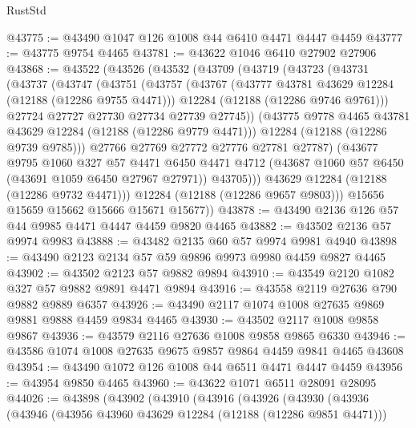 \begin{lexlean}{RustStd}
\begin{coremodule}
@43775 := @43490 @1047 @126 @1008 @44 @6410 @4471 @4447 @4459
@43777 := @43775 @9754 @4465
@43781 := @43622 @1046 @6410 @27902 @27906
@43868 := @43522
    (@43526
      (@43532
        (@43709
          (@43719
            (@43723
              (@43731
                (@43737
                  (@43747
                    (@43751
                      (@43757
                        (@43767
                          (@43777 @43781 @43629 @12284 (@12188 (@12286 @9755 @4471)))
                          @12284
                          (@12188 (@12286 @9746 @9761)))
                        @27724
                        @27727
                        @27730
                        @27734
                        @27739
                        @27745))
                    (@43775 @9778 @4465 @43781 @43629 @12284 (@12188 (@12286 @9779 @4471)))
                    @12284
                    (@12188 (@12286 @9739 @9785)))
                  @27766
                  @27769
                  @27772
                  @27776
                  @27781
                  @27787)
                (@43677
                  @9795
                  @1060
                  @327
                  @57
                  @4471
                  @6450
                  @4471
                  @4712
                  (@43687 @1060 @57 @6450 (@43691 @1059 @6450 @27967 @27971))
                  @43705)))
            @43629
            @12284
            (@12188 (@12286 @9732 @4471)))
          @12284
          (@12188 (@12286 @9657 @9803)))
        @15656
        @15659
        @15662
        @15666
        @15671
        @15677))
@43878 := @43490 @2136 @126 @57 @44 @9985 @4471 @4447 @4459 @9820 @4465
@43882 := @43502 @2136 @57 @9974 @9983
@43888 := @43482 @2135 @60 @57 @9974 @9981 @4940
@43898 := @43490 @2123 @2134 @57 @59 @9896 @9973 @9980 @4459 @9827 @4465
@43902 := @43502 @2123 @57 @9882 @9894
@43910 := @43549 @2120 @1082 @327 @57 @9882 @9891 @4471 @9894
@43916 := @43558 @2119 @27636 @790 @9882 @9889 @6357
@43926 := @43490 @2117 @1074 @1008 @27635 @9869 @9881 @9888 @4459 @9834 @4465
@43930 := @43502 @2117 @1008 @9858 @9867
@43936 := @43579 @2116 @27636 @1008 @9858 @9865 @6330
@43946 := @43586 @1074 @1008 @27635 @9675 @9857 @9864 @4459 @9841 @4465 @43608
@43954 := @43490 @1072 @126 @1008 @44 @6511 @4471 @4447 @4459
@43956 := @43954 @9850 @4465
@43960 := @43622 @1071 @6511 @28091 @28095
@44026 := @43898
    (@43902
      (@43910
        (@43916
          (@43926
            (@43930
              (@43936
                (@43946
                  (@43956 @43960 @43629 @12284 (@12188 (@12286 @9851 @4471)))

\end{coremodule}
\end{lexlean}
